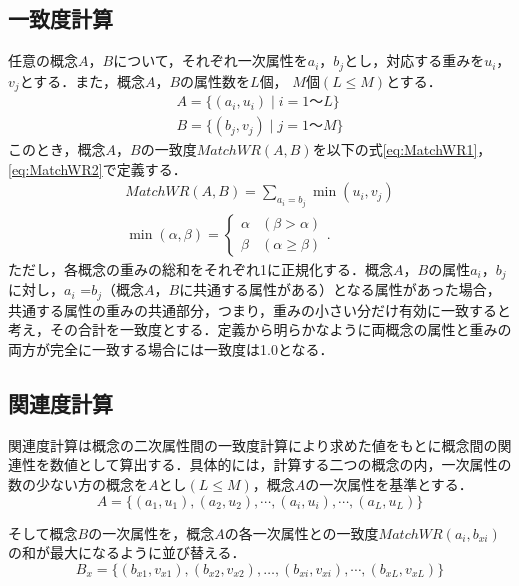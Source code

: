 \documentclass[japanese]{jnlp_1.4}
\begin{document}
\subsection{一致度計算}\label{degree_of_match}

任意の概念$A$，$B$について，それぞれ一次属性を$a_i$，$b_j$とし，対応する重みを$u_i$，$v_j$とする．また，概念$A$，$B$の属性数を$L$個，
\pagebreak
$M$個$(L\le M)$とする．
\begin{gather*}
A=\{(a_i,u_i) \mid i=1〜L\} \\
B=\{(b_j,v_j) \mid j=1〜M\}
\end{gather*}
このとき，概念$A$，$B$の一致度$MatchWR(A,B)$を以下の式\ref{eq:MatchWR1}，\ref{eq:MatchWR2}で定義する．
\begin{gather}
 MatchWR(A,B)=\sum_{a_i=b_j}\min(u_i,v_j)
	\label{eq:MatchWR1}\\
 \min(\alpha,\beta)=
  \begin{cases} 
	\alpha & (\beta > \alpha) \\
	\beta & (\alpha \geq \beta)
  \end{cases}
	\label{eq:MatchWR2}. 
\end{gather}
ただし，各概念の重みの総和をそれぞれ1に正規化する．概念$A$，$B$の属性$a_i$，$b_j$に対し，$a_i$ =$ b_j$（概念$A$，$B$に共通する属性がある）となる属性があった場合，共通する属性の重みの共通部分，つまり，重みの小さい分だけ有効に一致すると考え，その合計を一致度とする．定義から明らかなように両概念の属性と重みの両方が完全に一致する場合には一致度は1.0となる．


\subsection{関連度計算}
\label{degree_of_association}

関連度計算は概念の二次属性間の一致度計算により求めた値をもとに概念間の関連性を数値として算出する．具体的には，計算する二つの概念の内，一次属性の数の少ない方の概念を$A$とし$(L\le M)$，概念$A$の一次属性を基準とする．
\[
 A=\{(a_1,u_1),(a_2,u_2),\cdots,(a_i,u_i),\cdots,(a_L,u_L)\}
\]

そして概念$B$の一次属性を，概念$A$の各一次属性との一致度$MatchWR(a_i,b_{xi})$の和が最大になるように並び替える．
\[
 B_x = \{(b_{x1},v_{x1}),(b_{x2},v_{x2}),\dots,(b_{xi},v_{xi}),\cdots,(b_{xL},v_{xL})\}
\]
\end{document}

